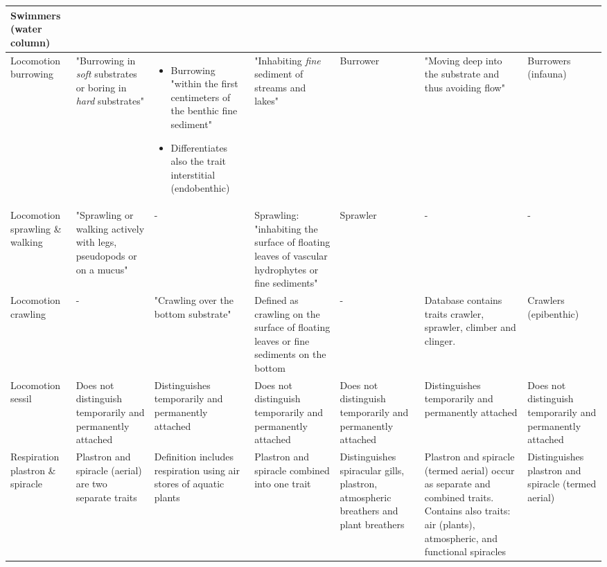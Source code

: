 \documentclass[../Draft_harmonization_paper.tex]{subfiles}
\begin{document}
\begin{landscape}
\begin{longtable}{m{1.7cm}|m{3cm}|m{3cm}|m{3cm}|m{3cm}|m{3cm}|m{3cm}}
        Swimmers (water column)
        \\
        \midrule
        Locomotion burrowing & 
        "Burrowing in \textit{soft} substrates or boring in \textit{hard} substrates" & 
        \begin{itemize}
            \item Burrowing "within the first centimeters of the benthic fine sediment"
            \item Differentiates also the trait interstitial (endobenthic)
        \end{itemize} & 
        "Inhabiting \textit{fine} sediment of streams and lakes" &
        Burrower & 
        "Moving deep into the substrate and thus avoiding flow" &
        Burrowers (infauna)
        \\
        \midrule
        Locomotion sprawling \& walking & 
        "Sprawling or walking actively with legs, pseudopods or on a mucus" &
        - & 
        Sprawling: "inhabiting the surface of floating leaves of vascular hydrophytes or fine sediments" & 
        Sprawler &
        - & 
        - \\
        \midrule
        Locomotion crawling & 
        - &
        "Crawling over the bottom substrate" & 
        Defined as crawling on the surface of floating leaves or fine sediments on the bottom & 
        - & 
        Database contains traits crawler, 
        sprawler, climber and clinger. &
        Crawlers (epibenthic) \\
        \midrule
        Locomotion sessil & 
        Does not distinguish temporarily and permanently attached & 
        Distinguishes temporarily and permanently attached & 
        Does not distinguish temporarily and permanently attached & 
        Does not distinguish temporarily and permanently attached & 
        Distinguishes temporarily and permanently attached & 
        Does not distinguish temporarily and permanently attached \\
        \toprule[.1em]
        Respiration plastron \& spiracle & 
        Plastron and spiracle (aerial) are two separate traits & 
        Definition includes respiration using air stores of aquatic plants & 
        Plastron and spiracle combined into one trait & 
        Distinguishes spiracular gills, plastron, atmospheric breathers and plant breathers &
        Plastron and spiracle (termed aerial) occur as separate and combined traits. Contains also traits: air (plants), atmospheric, and functional spiracles &
        Distinguishes plastron and spiracle (termed aerial) \\

\end{longtable}
\end{landscape}
\end{document}
